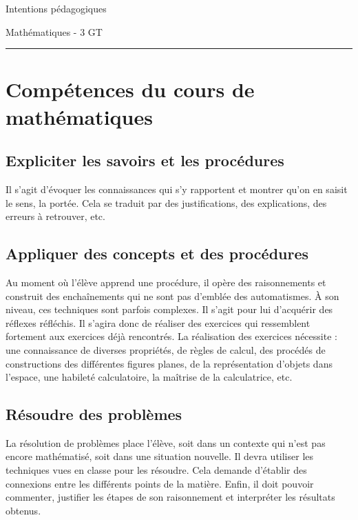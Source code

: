\documentclass[parskip=half-, numbers=enddot, DIV=15]{scrartcl}
\begin{document}
\begin{center}
	\bfseries
	\begin{Huge}
		Intentions pédagogiques
	\end{Huge}
	\smallbreak
	\begin{Large}
		Mathématiques - 3 GT
	\end{Large}
	\smallbreak
	\rule[10pt]{.3\linewidth}{1 pt}
\end{center}
\section{Compétences du cours de mathématiques}

\subsection{Expliciter les savoirs et les procédures}

Il s'agit d'évoquer les connaissances qui s'y rapportent et montrer
qu'on en saisit le sens, la portée. Cela se traduit par des
justifications, des explications, des erreurs à retrouver, etc.

\subsection{Appliquer des concepts et des procédures}

Au moment où l'élève apprend une procédure, il opère des raisonnements
et construit des enchaînements qui ne sont pas d'emblée des
automatismes. À son niveau, ces techniques sont parfois complexes. Il
s'agit pour lui d'acquérir des réflexes réfléchis. Il s'agira donc de
réaliser des exercices qui ressemblent fortement aux exercices déjà
rencontrés. La réalisation des exercices nécessite : une connaissance de
diverses propriétés, de règles de calcul, des procédés de constructions
des différentes figures planes, de la représentation d'objets dans
l'espace, une habileté calculatoire, la maîtrise de la
calculatrice, etc.

\subsection{Résoudre des problèmes}

La résolution de problèmes place l'élève, soit dans un contexte qui
n'est pas encore mathématisé, soit dans une situation nouvelle. Il devra
utiliser les techniques vues en classe pour les résoudre. Cela demande
d'établir des connexions entre les différents points de la matière.
Enfin, il doit pouvoir commenter, justifier les étapes de son
raisonnement et interpréter les résultats obtenus.
\end{document}
